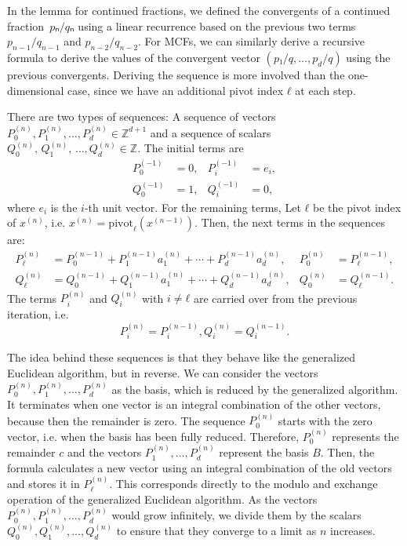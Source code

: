 In the lemma for continued fractions,
we defined the convergents of a continued fraction~$pₙ/qₙ$
using a linear recurrence based on the previous two terms~$p_{n-1}/q_{n-1}$ and $p_{n-2}/q_{n-2}$.
For MCFs, we can similarly derive a recursive formula to derive the values of
the convergent vector $(p₁/q, \dots, p_d/q)$ using the previous convergents.
Deriving the sequence is more involved than the one-dimensional case,
since we have an additional pivot index $ℓ$ at each step.

There are two types of sequences:
A sequence of vectors $P_0^{(n)}, P_1^{(n)}, …, P_d^{(n)} ∈ ℤ^{d+1}$ and a sequence
of scalars $Q_0^{(n)}\!,\, Q_1^{(n)}\!,\, …, Q_d^{(n)} ∈ ℤ$.
The initial terms are
\[
  \begin{aligned}
    P_0^{(-1)} & = 0, & P_i^{(-1)} & = e_i, \\
    Q_0^{(-1)} & = 1, & Q_i^{(-1)} & = 0,
  \end{aligned}
\]
where $e_i$ is the $i$-th unit vector.
For the remaining terms,
Let $ℓ$ be the pivot index of $x^{(n)}$, i.e. $x^{(n)} = \mathrm{pivot}_ℓ(x^{(n-1)})$.
Then, the next terms in the sequences are:
\begin{equation}
  \label{eq:mcf-wallis}
  \begin{aligned}
    P_ℓ^{(n)} & = P_0^{(n-1)} + P_1^{(n-1)} a_1^{(n)} + ⋯ + P_d^{(n-1)} a_d^{(n)}, &
    P_0^{(n)} & = P_ℓ^{(n-1)}, \\
    Q_ℓ^{(n)} & = Q_0^{(n-1)} + Q_1^{(n-1)} a_1^{(n)} + ⋯ + Q_d^{(n-1)} a_d^{(n)}, &
    Q_0^{(n)} & = Q_ℓ^{(n-1)}.
  \end{aligned}
\end{equation}
The terms $P_i^{(n)}$ and $Q_i^{(n)}$ with $i ≠ ℓ$ are carried over from the previous iteration,
i.e.
\[
  P_i^{(n)} = P_i^{(n-1)}, Q_i^{(n)} = Q_i^{(n-1)}.
\]

The idea behind these sequences is that they behave like the generalized
Euclidean algorithm, but in reverse.
We can consider the vectors $P_0^{(n)}, P_1^{(n)}, …, P_d^{(n)}$ as the basis,
which is reduced by the generalized algorithm.
It terminates when one vector is an integral combination
of the other vectors, because then the remainder is zero.
The sequence $P_0^{(n)}$ starts with the zero vector,
i.e. when the basis has been fully reduced.
Therefore, $P_0^{(n)}$ represents the remainder $c$ and the vectors $P_1^{(n)},
…, P_d^{(n)}$ represent the basis $B$.
Then, the formula calculates a new vector using an integral combination of the
old vectors and stores it in $P_ℓ^{(n)}$.
This corresponds directly to the modulo and exchange operation of the
generalized Euclidean algorithm.
As the vectors $P_0^{(n)}, P_1^{(n)}, …, P_d^{(n)}$ would grow infinitely, we
divide them by the scalars $Q_0^{(n)}, Q_1^{(n)}, …, Q_d^{(n)}$ to ensure that
they converge to a limit as $n$ increases.

